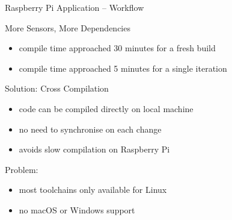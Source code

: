 \documentclass[aspectratio=169]{beamer}
\newcommand\green[1]{{\color{green(ncs)}#1}}
\newcommand\red[1]{{\color{amaranth}#1}}
\begin{document}
  \begin{frame}{Raspberry Pi Application -- Workflow}
    \begin{block}{More Sensors, More Dependencies}
      \begin{itemize}
        \item compile time approached 30 minutes for a fresh build
        \item compile time approached 5 minutes for a single iteration
      \end{itemize}
    \end{block}

     {
    \begin{block}{\green{Solution:} Cross Compilation}
      \begin{itemize}
        \item code can be compiled directly on local machine
        \item no need to synchronise on each change
        \item avoids slow compilation on Raspberry Pi
      \end{itemize}
    \end{block}
    }

     {
    \begin{block}{\red{Problem:}}
      \begin{itemize}
        \item most toolchains only available for Linux
        \item no macOS or Windows support
      \end{itemize}
    \end{block}
    }
  \end{frame}
\end{document}
